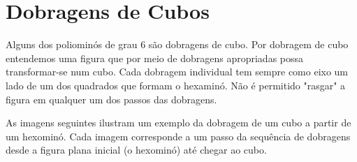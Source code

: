 \documentclass[11pt]{article}
\begin{document}
\section{Dobragens de Cubos}

Alguns dos poliominós de grau 6 são dobragens de cubo. Por dobragem de
cubo entendemos uma figura que por meio de dobragens apropriadas possa
transformar-se num cubo. Cada dobragem individual tem sempre como eixo
um lado de um dos quadrados que formam o hexaminó. Não é permitido
"rasgar" a figura em qualquer um dos passos das dobragens.

As imagens seguintes ilustram um exemplo da dobragem de um cubo a
partir de um hexominó. Cada imagem corresponde a um passo da sequência
de dobragens desde a figura plana inicial (o hexominó) até chegar ao
cubo.

\begin{figure}[H]
  \centering



\end{figure}
\end{document}
